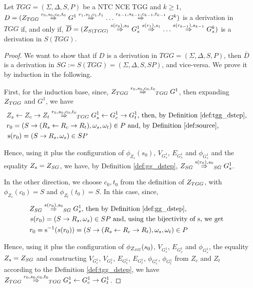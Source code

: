 \begin{theorem}
	\label{thm:one_d_enough}
	Let $TGG = (\Sigma, \Delta, S, P)$ be a NTC NCE TGG and $k \ge 1$, \\
	$D = (\startTG{TGG} \tderiv{r_0}{s_0,c_0,t_0}{} G^1 \tderiv{r_1}{s_1,c_1,t_1}{} \dots \tderiv{r_{k-1}}{s_{k-1},c_{k-1},t_{k-1}}{} G^k)$ is a derivation in $TGG$ if, and only if, $\overline{D} = (\startG{S(TGG)} \deriv{s(r_0)}{s_0}{} G^1_s \deriv{s(r_1)}{s_1}{} \dots \deriv{s(r_{k-1})}{s_{k-1}}{} G^k_s)$ is a derivation in $S(TGG)$.
\end{theorem}
\begin{proof}
	We want to show that if $D$ is a derivation in $TGG = (\Sigma, \Delta, S, P)$, then $\overline{D}$ is a derivation in $SG := S(TGG) = (\Sigma, \Delta, S, SP)$, and vice-versa. We prove it by induction in the following.
	
	First, for the induction base, since, $\startTG{TGG} \tderiv{r_0}{s_0,c_0,t_0}{TGG} G^1$, then expanding $Z_{TGG}$ and $G^1$, we have
	\begin{align*}
		& Z_s \ms{} Z_c \mt{} Z_t \tderiv{r_0}{s_0,c_0,t_0}{TGG} G^1_s \ms{} G^1_c \mt{} G^1_t \text{, then, by Definition \ref{def:tgg_dstep},}\\
		& r_0 = (S \pro (R_s \ms{} R_c \mt{} R_t), \omega_s, \omega_t) \in P \text{ and, by Definition \ref{def:source},}\\
		& \source(r_0) = (S \pro R_s, \omega_s) \in SP
	\end{align*}
	
	Hence, using it plus the configuration of $\phi_{Z_s}(s_0)$, $V_{G^1_s}$, $E_{G^1_s}$ and $\phi_{G^1_s}$ and the equality $Z_s = Z_{SG}$, we have, by Definition \ref{def:gg_dstep}, $\startG{SG} \deriv{\source(r_0)}{s_0}{SG} G^1_s$.
	
	In the other direction, we choose $c_0, t_0$ from the definition of $Z_{TGG}$, with $\phi_{Z_c}(c_0) = S$ and  $\phi_{Z_t}(t_0) = S$. In this case, since,
	\begin{align*}
		& \startG{SG} \deriv{s(r_0)}{s_0}{SG} G^1_s \text{, then by Definition \ref{def:gg_dstep},}\\
		& \source(r_0) = (S \pro R_s, \omega_s) \in SP \text{ and, using the bijectivity of $\source$, we get}\\
		& r_0 = \source^{-1}(s(r_0)) = (S \pro (R_s \ms{} R_c \mt{} R_t), \omega_s, \omega_t) \in P
	\end{align*}
	
	Hence, using it plus the configuration of $\phi_{Z_{SG}}(s_0)$, $V_{G^1_s}$, $E_{G^1_s}$ and $\phi_{G^1_s}$, the equality $Z_s = Z_{SG}$ and constructing $V_{G^1_c}$, $V_{G^1_t}$, $E_{G^1_c}$, $E_{G^1_t}$, $\phi_{G^1_c}$, $\phi_{G^1_t}$ from $Z_c$ and $Z_t$ according to the Definition \ref{def:tgg_dstep}, we have $\startTG{TGG} \tderiv{r_0}{s_0,c_0,t_0}{TGG} G^1_s \ms{} G^1_c \mt{} G^1_t$.
	

\end{proof}
